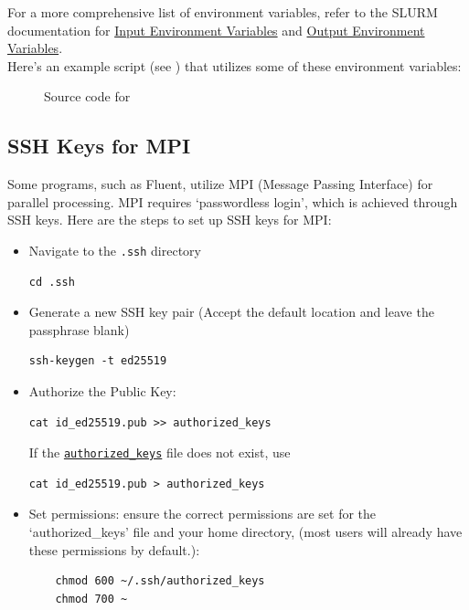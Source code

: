 \documentclass{easychair}
\begin{document}
\noindent For a more comprehensive list of environment variables, refer to the SLURM documentation for 
\href{https://slurm.schedmd.com/srun.html#SECTION_INPUT-ENVIRONMENT-VARIABLES}{Input Environment Variables} and
\href{https://slurm.schedmd.com/srun.html#SECTION_OUTPUT-ENVIRONMENT-VARIABLES}{Output Environment Variables}.\\

\noindent Here's an example script (see ) that utilizes some of these environment variables:

\begin{figure}[htpb]
    
    \caption{Source code for }
	\label{fig:tmpdir.sh}
\end{figure}

\subsection{SSH Keys for MPI}
\label{sect:ssh-mpi}

Some programs, such as Fluent, utilize MPI (Message Passing Interface) for parallel processing. 
MPI requires `passwordless login', which is achieved through SSH keys. Here are the steps to set up SSH keys for MPI:

\begin{itemize}
	\item Navigate to the \texttt{.ssh} directory
	\begin{verbatim}cd .ssh\end{verbatim}

	\item Generate a new SSH key pair (Accept the default location and leave the passphrase blank)
	\begin{verbatim}ssh-keygen -t ed25519\end{verbatim}

	\item Authorize the Public Key:
	\begin{verbatim}cat id_ed25519.pub >> authorized_keys\end{verbatim} 
	If the \texttt{\href{https://www.ssh.com/academy/ssh/authorized-keys-file}{authorized\_keys}} file does not exist, use
	\begin{verbatim}cat id_ed25519.pub > authorized_keys\end{verbatim}

	\item Set permissions: ensure the correct permissions are set for the `authorized\_keys' file and your home directory,
	(most users will already have these permissions by default.):
	\begin{verbatim}
	chmod 600 ~/.ssh/authorized_keys
	chmod 700 ~
	\end{verbatim}
\end{itemize}
\end{document}
